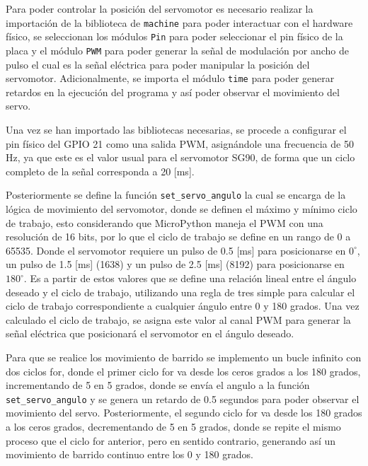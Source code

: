 \documentclass[letterpaper,12pt]{article}
\begin{document}
    Para poder controlar la posición del servomotor es necesario realizar la importación de la biblioteca de \texttt{machine} para poder interactuar con el hardware físico, se seleccionan los módulos \texttt{Pin} para poder seleccionar el pin físico de la placa y el módulo \texttt{PWM} para poder generar la señal de modulación por ancho de pulso el cual es la señal eléctrica para poder manipular la posición del servomotor. Adicionalmente, se importa el módulo \texttt{time} para poder generar retardos en la ejecución del programa y así poder observar el movimiento del servo.

    Una vez se han importado las bibliotecas necesarias, se procede a configurar el pin físico del GPIO 21 como una salida PWM, asignándole una frecuencia de 50 Hz, ya que este es el valor usual para el servomotor SG90, de forma que un ciclo completo de la señal corresponda a 20 [ms].

    Posteriormente se define la función \texttt{set\_servo\_angulo} la cual se encarga de la lógica de movimiento del servomotor, donde se definen el máximo y mínimo ciclo de trabajo, esto considerando que MicroPython maneja el PWM con una resolución de 16 bits, por lo que el ciclo de trabajo se define en un rango de 0 a 65535. Donde el servomotor requiere un pulso de 0.5 [ms] para posicionarse en $0^\circ$, un pulso de 1.5 [ms] (1638) y un pulso de 2.5 [ms] (8192) para posicionarse en $180^\circ$. Es a partir de estos valores que se define una relación lineal entre el ángulo deseado y el ciclo de trabajo, utilizando una regla de tres simple para calcular el ciclo de trabajo correspondiente a cualquier ángulo entre 0 y 180 grados. Una vez calculado el ciclo de trabajo, se asigna este valor al canal PWM para generar la señal eléctrica que posicionará el servomotor en el ángulo deseado.

    Para que se realice los movimiento de barrido se implemento un bucle infinito con dos ciclos for, donde el primer ciclo for va desde los ceros grados a los 180 grados, incrementando de 5 en 5 grados, donde se envía el angulo a la función \texttt{set\_servo\_angulo} y se genera un retardo de 0.5 segundos para poder observar el movimiento del servo. Posteriormente, el segundo ciclo for va desde los 180 grados a los ceros grados, decrementando de 5 en 5 grados, donde se repite el mismo proceso que el ciclo for anterior, pero en sentido contrario, generando así un movimiento de barrido continuo entre los 0 y 180 grados.
\end{document}
